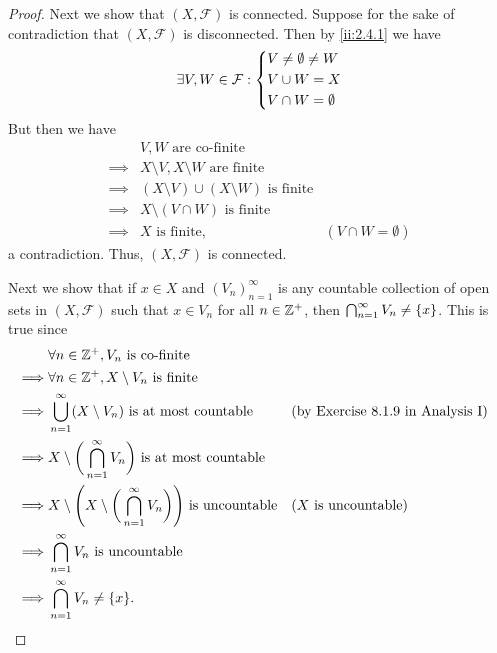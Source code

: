 \begin{proof}
  Next we show that \((X, \mathcal{F})\) is connected.
  Suppose for the sake of contradiction that \((X, \mathcal{F})\) is disconnected.
  Then by \cref{ii:2.4.1} we have
  \[
    \exists V, W \in \mathcal{F} : \begin{dcases}
      V \neq \emptyset \neq W \\
      V \cup W = X            \\
      V \cap W = \emptyset
    \end{dcases}
  \]
  But then we have
  \begin{align*}
             & V, W \text{ are co-finite}                                                      \\
    \implies & X \setminus V, X \setminus W \text{ are finite}                                 \\
    \implies & (X \setminus V) \cup (X \setminus W) \text{ is finite}                          \\
    \implies & X \setminus (V \cap W) \text{ is finite}                                        \\
    \implies & X \text{ is finite},                                   & (V \cap W = \emptyset)
  \end{align*}
  a contradiction.
  Thus, \((X, \mathcal{F})\) is connected.

  Next we show that if \(x \in X\) and \((V_n)_{n = 1}^\infty\) is any countable collection of open sets in \((X, \mathcal{F})\) such that \(x \in V_n\) for all \(n \in \mathbb{Z}^+\), then \(\bigcap_{n = 1}^\infty V_n \neq \left\lbrace x\right\rbrace\).
  This is true since
  \begin{align*}
             & \forall n \in \Z^+, V_n \text{ is co-finite}                                                                                                    \\
    \implies & \forall n \in \Z^+, X \setminus V_n \text{ is finite}                                                                                           \\
    \implies & \bigcup_{n = 1}^\infty (X \setminus V_n) \text{ is at most countable}                             &  & \text{(by Exercise 8.1.9 in Analysis I)} \\
    \implies & X \setminus \bigg(\bigcap_{n = 1}^\infty V_n\bigg) \text{ is at most countable}                                                                 \\
    \implies & X \setminus \Bigg(X \setminus \bigg(\bigcap_{n = 1}^\infty V_n\bigg)\Bigg) \text{ is uncountable} &  & \text{(\(X\) is uncountable)}            \\
    \implies & \bigcap_{n = 1}^\infty V_n \text{ is uncountable}                                                                                               \\
    \implies & \bigcap_{n = 1}^\infty V_n \neq \set{x}.
  \end{align*}


\end{proof}

